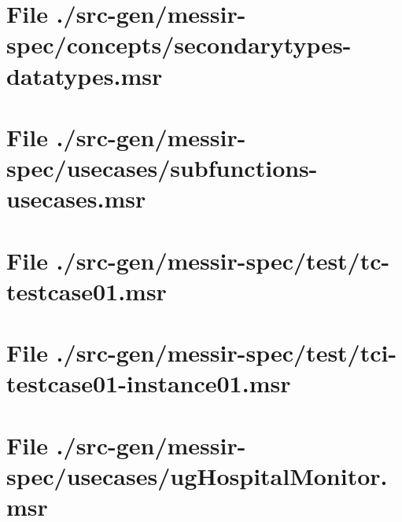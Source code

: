 \section[File /src-gen/messir-spec/concepts/secondarytypes-datatypes.msr]{File ./src-gen/messir-spec/concepts/secondarytypes-datatypes.msr}
\scriptsize

\normalsize
	
\section[File /src-gen/messir-spec/usecases/subfunctions-usecases.msr]{File ./src-gen/messir-spec/usecases/subfunctions-usecases.msr}
\scriptsize

\normalsize
	
\section[File /src-gen/messir-spec/test/tc-testcase01.msr]{File ./src-gen/messir-spec/test/tc-testcase01.msr}
\scriptsize

\normalsize
	
\section[File /src-gen/messir-spec/test/tci-testcase01-instance01.msr]{File ./src-gen/messir-spec/test/tci-testcase01-instance01.msr}
\scriptsize

\normalsize
	
\section[File /src-gen/messir-spec/usecases/ugHospitalMonitor.msr]{File ./src-gen/messir-spec/usecases/ugHospitalMonitor.msr}
\scriptsize

\normalsize
	
